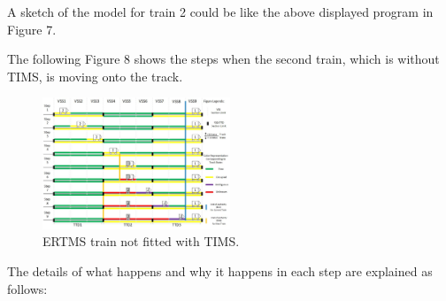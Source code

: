 \documentclass[article,dr=phil,type=drfinal,colorback,accentcolor=tud9c]{tudthesis}
\begin{document}
  A sketch of the model for train 2 could be like the above displayed program in Figure 7.
    
  The following Figure 8 shows the steps when the second train, which is without TIMS, is moving onto the track.
    
  \begin{figure}[H]
	\begin{center}
		\includegraphics[width=0.5\textwidth]{train2}
		\caption[Caption for LOF]{ERTMS train not fitted with TIMS.}
	\end{center}
  \end{figure}

  The details of what happens and why it happens in each step are explained as follows:
  
\end{document}
